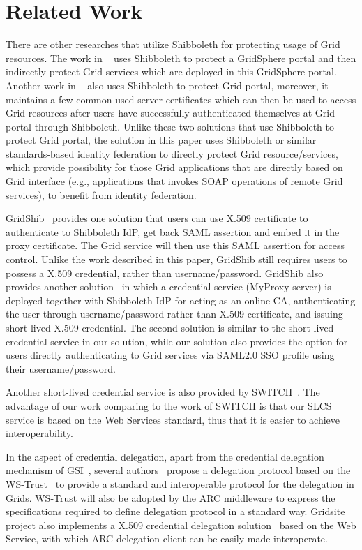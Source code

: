 \documentclass[conference]{IEEEtran}
\begin{document}
\section{Related Work}
\label{sec:relatedwork}
There are other researches that utilize Shibboleth for protecting usage of Grid
resources. The work in ~\cite{J.Watt06} uses Shibboleth to protect a GridSphere portal and
then indirectly protect Grid services which are deployed in this GridSphere portal.
Another work in ~\cite{R.O.Sinnott06} also uses Shibboleth to protect Grid portal,
moreover, it maintains a few common used server certificates which can then be used to access
Grid resources after users have successfully authenticated themselves at Grid portal
through Shibboleth. Unlike these two solutions that use Shibboleth to protect Grid
portal, the solution in this paper uses Shibboleth or similar standards-based identity federation to
directly protect Grid resource/services, which provide possibility for those Grid applications
that are directly based on Grid interface (e.g., applications that invokes SOAP operations of
remote Grid services), to benefit from identity federation.

GridShib~\cite{T.Scavo07,VWelch05} provides one solution that users can use
X.509 certificate to authenticate to Shibboleth IdP, get back SAML assertion and embed
it in the proxy certificate. The Grid service will then use this SAML assertion for
access control. Unlike the work described in this paper, GridShib still requires users to
possess a X.509 credential, rather than username/password. GridShib also provides another 
solution~\cite{TBarton06} in which a credential service (MyProxy server) is
deployed together with Shibboleth IdP for acting as an online-CA, authenticating the user through
username/password rather than X.509 certificate, and issuing short-lived X.509 credential. The
second solution is similar to the short-lived credential service in our solution, while our
solution also provides the option for users directly authenticating to Grid services via
SAML2.0 SSO profile using their username/password.

Another short-lived credential service is also provided by SWITCH~\cite{switchslcslink}. 
The advantage of our work comparing to the work of SWITCH is that 
our SLCS service is based on the Web Services standard, thus that it is easier to
achieve interoperability.

In the aspect of credential delegation, apart from the credential delegation
mechanism of GSI~\cite{IFoster98,VWelch04}, several authors~\cite{MAhsant04} propose a
delegation protocol based on the WS-Trust~\cite{WSTrustlink} to provide a standard and interoperable
protocol for the delegation in Grids. WS-Trust will also be adopted by the ARC middleware
to express the specifications required to define delegation protocol in a standard way.
Gridsite project also implements a X.509 credential delegation solution~\cite{GridSitelink} based on
the Web Service, with which ARC delegation client can be easily made interoperate.
\end{document}
